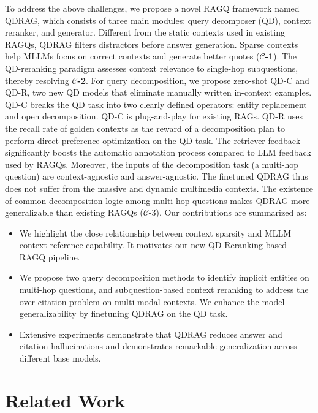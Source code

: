 \documentclass[letterpaper]{article} %
\begin{document}
To address the above challenges,
we propose a novel RAGQ framework named QDRAG, which consists of three main modules: query decomposer (QD), context reranker, and generator.
Different from the static contexts used in existing RAGQs, QDRAG filters distractors before answer generation. Sparse contexts help MLLMs focus on correct contexts and generate better quotes (\textbf{$\bm{\mathcal{C}}$-1}).
The QD-reranking paradigm assesses context relevance to single-hop subquestions, thereby resolving \textbf{$\bm{\mathcal{C}}$-2}.
For query decomposition, we propose zero-shot QD-C and QD-R, two new QD models that eliminate manually written in-context examples.  
QD-C breaks the QD task into two clearly defined operators: entity replacement and open decomposition. QD-C is plug-and-play for existing RAGs. 
QD-R uses the recall rate of golden contexts as the reward of a decomposition plan to perform direct preference optimization on the QD task. 
The retriever feedback significantly boosts the automatic annotation process compared to LLM feedback used by RAGQs. Moreover, the inputs of the decomposition task (a multi-hop question) are context-agnostic and answer-agnostic. The finetuned QDRAG thus does not suffer from the massive and dynamic multimedia contexts. The existence of common decomposition logic among multi-hop questions makes QDRAG more generalizable than existing RAGQs ($\bm{\mathcal{C}}$-3).
Our contributions are summarized as: 
\begin{itemize}
    \item We highlight the close relationship between context sparsity and MLLM context reference capability. It motivates our new QD-Reranking-based RAGQ pipeline.
    \item We propose two query decomposition methods to identify implicit entities on multi-hop questions, and subquestion-based context reranking to address the over-citation problem on multi-modal contexts. We enhance the model generalizability by finetuning QDRAG on the QD task.
    \item Extensive experiments demonstrate that QDRAG reduces answer and citation hallucinations and demonstrates remarkable generalization across different base models.
\end{itemize}


\section{Related Work}
\end{document}
